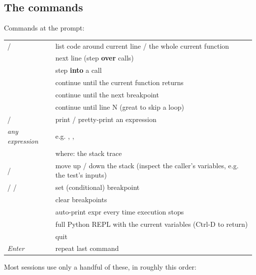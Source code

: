 \documentclass[10pt,a4paper]{article}
\begin{document}
\subsection{The commands}
Commands at the  prompt:
\begin{datatable}{}{\footnotesize}
\begin{xltabular}{\linewidth}{@{}Y{0.53}Y{1.47}@{}}
 &  \\ \hline
\endhead
{} /  & list code around current line / the whole current function \\
 & next line (step \textbf{over} calls) \\
 & step \textbf{into} a call \\
 & continue until the current function returns \\
 & continue until the next breakpoint \\
 & continue until line N (great to skip a loop) \\
 /  & print / pretty-print an expression \\
\emph{any expression} & e.g. , ,  \\
 & where: the stack trace \\
 /  & move up / down the stack (inspect the caller’s variables, e.g. the test’s inputs) \\
 /  /  & set (conditional) breakpoint \\
 & clear breakpoints \\
 & auto-print expr every time execution stops \\
 & full Python REPL with the current variables (Ctrl-D to return) \\
 & quit \\
\emph{Enter} & repeat last command \\
\hline
\end{xltabular}
\end{datatable}
Most sessions use only a handful of these, in roughly this order:
\end{document}
